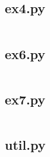 \documentclass[10pt,a4paper,oneside,onecolumn]{article}
\begin{document}
\subsection{ex4.py}\label{app:ex4}
\inputminted{python}{../src/ex4.py}
\newpage

\subsection{ex6.py}\label{app:ex6}
\inputminted{python}{../src/ex6.py}
\newpage

\subsection{ex7.py}\label{app:ex7}
\inputminted{python}{../src/ex7.py}
\newpage

\subsection{util.py}\label{app:util}
\inputminted{python}{../src/util.py}
\end{document}
